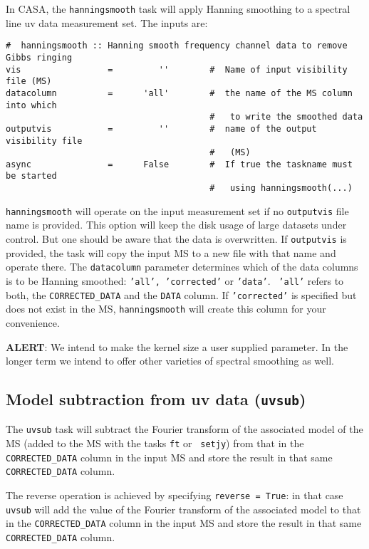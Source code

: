 In CASA, the {\tt hanningsmooth} task will apply Hanning smoothing to a
spectral line uv data measurement set.  The inputs are:

\small
\begin{verbatim}
#  hanningsmooth :: Hanning smooth frequency channel data to remove Gibbs ringing
vis                 =         ''        #  Name of input visibility file (MS)
datacolumn          =      'all'        #  the name of the MS column into which
                                        #   to write the smoothed data
outputvis           =         ''        #  name of the output visibility file
                                        #   (MS)
async               =      False        #  If true the taskname must be started
                                        #   using hanningsmooth(...)
\end{verbatim}
\normalsize

{\tt hanningsmooth} will operate on the input measurement set if no
{\tt outputvis} file name is provided. This option will keep the disk
usage of large datasets under control. But one should be aware that
the data is overwritten. If {\tt outputvis} is provided, the task will
copy the input MS to a new file with that name and operate there. The
{\tt datacolumn} parameter determines which of the data columns is to
be Hanning smoothed: {\tt 'all', 'corrected'} or {\tt 'data'}. {\tt
  'all'} refers to both, the {\tt CORRECTED\_DATA} and the {\tt DATA}
column. If {\tt 'corrected'} is specified but does not exist in the
MS, {\tt hanningsmooth} will create this column for your convenience.

{\bf ALERT}: We intend to make the kernel size a user supplied
parameter.  In the longer term we intend to offer other varieties of
spectral smoothing as well.

\subsection{Model subtraction from uv data ({\tt uvsub})}
\label{section:cal.other.uvsub}

The {\tt uvsub} task will subtract the Fourier transform of the
associated model of the MS (added to the MS with the tasks {\tt ft} or {\tt
  setjy}) from that in the {\tt
  CORRECTED\_DATA} column in the input MS and store the result in that
same {\tt CORRECTED\_DATA} column. 

The reverse operation is achieved by specifying {\tt reverse = True}:
in that case {\tt uvsub} will add the value of the Fourier transform of
the associated model to that in the {\tt CORRECTED\_DATA} column in
the input MS and store the result in that same {\tt CORRECTED\_DATA}
column.

